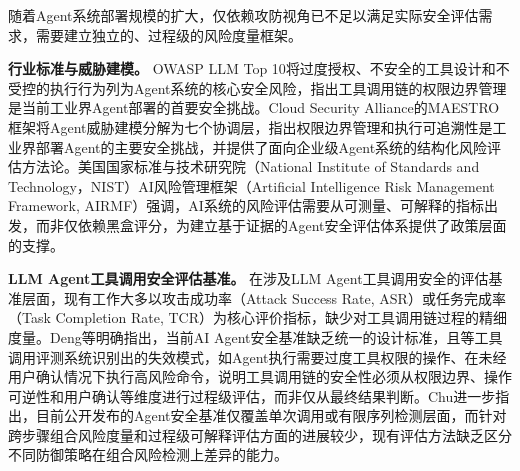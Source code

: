 随着Agent系统部署规模的扩大，仅依赖攻防视角已不足以满足实际安全评估需求，需要建立独立的、过程级的风险度量框架。

\textbf{行业标准与威胁建模。}
OWASP LLM Top 10\cite{owasp2025llmtop10}将过度授权、不安全的工具设计和不受控的执行行为列为Agent系统的核心安全风险，指出工具调用链的权限边界管理是当前工业界Agent部署的首要安全挑战。Cloud Security Alliance的MAESTRO框架\cite{huang2025maestro}将Agent威胁建模分解为七个协调层，指出权限边界管理和执行可追溯性是工业界部署Agent的主要安全挑战，并提供了面向企业级Agent系统的结构化风险评估方法论。美国国家标准与技术研究院（National Institute of Standards and Technology，NIST）AI风险管理框架（Artificial Intelligence Risk Management Framework, AIRMF）\cite{nist2023airmf}强调，AI系统的风险评估需要从可测量、可解释的指标出发，而非仅依赖黑盒评分，为建立基于证据的Agent安全评估体系提供了政策层面的支撑。

\textbf{LLM Agent工具调用安全评估基准。}
在涉及LLM Agent工具调用安全的评估基准层面，现有工作大多以攻击成功率（Attack Success Rate, ASR）或任务完成率（Task Completion Rate, TCR）为核心评价指标，缺少对工具调用链过程的精细度量。Deng等\cite{deng2025agentsunderthreat}明确指出，当前AI Agent安全基准缺乏统一的设计标准，且\cite{ruan2024toolemu}等工具调用评测系统识别出的失效模式，如Agent执行需要过度工具权限的操作、在未经用户确认情况下执行高风险命令，说明工具调用链的安全性必须从权限边界、操作可逆性和用户确认等维度进行过程级评估，而非仅从最终结果判断。Chu\cite{chu2026systematic}进一步指出，目前公开发布的Agent安全基准仅覆盖单次调用或有限序列检测层面，而针对跨步骤组合风险度量和过程级可解释评估方面的进展较少，现有评估方法缺乏区分不同防御策略在组合风险检测上差异的能力。

